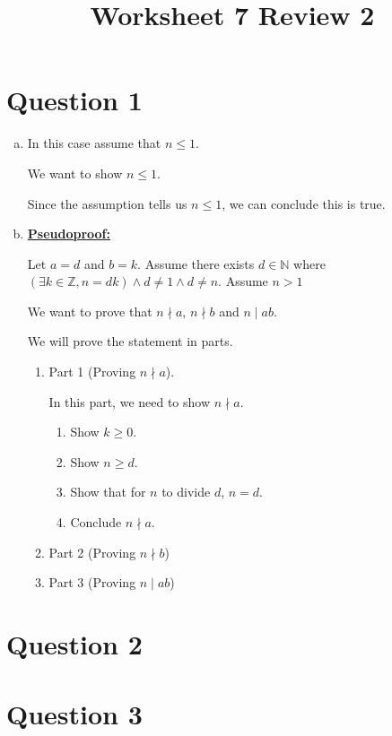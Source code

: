 \documentclass[12pt]{article}
\begin{document}
\title{Worksheet 7 Review 2}
\maketitle

\section*{Question 1}
\begin{enumerate}[a.]
    \item

    In this case assume that $n \leq 1$.

    \bigskip

    We want to show $n \leq 1$.

    \bigskip

    Since the assumption tells us $n \leq 1$, we can conclude this is true.

    \item

    \begin{mdframed}

    \underline{\textbf{Pseudoproof:}}

    \bigskip

    Let $a = d$ and $b = k$. Assume there exists $d \in \mathbb{N}$ where
    $(\exists k \in \mathbb{Z}, n = dk) \land d \neq 1 \land d \neq n$. Assume $n > 1$

    \bigskip

    We want to prove that $n \nmid a$, $n \nmid b$ and $n \mid ab$.

    \bigskip

    We will prove the statement in parts.

    \bigskip

    \begin{enumerate}[1.]
        \item Part 1 (Proving $n \nmid a$).

        \bigskip

        In this part, we need to show $n \nmid a$.

        \bigskip

        \begin{enumerate}[1.]
            \item Show $k \geq 0$.
            \item Show $n \geq d$.
            \item Show that for $n$ to divide $d$, $n = d$.
            \item Conclude $n \nmid a$.
        \end{enumerate}

        \item Part 2 (Proving $n \nmid b$)
        \item Part 3 (Proving $n \mid ab$)

    \end{enumerate}

    \end{mdframed}


\end{enumerate}

\section*{Question 2}

\section*{Question 3}
\end{document}
